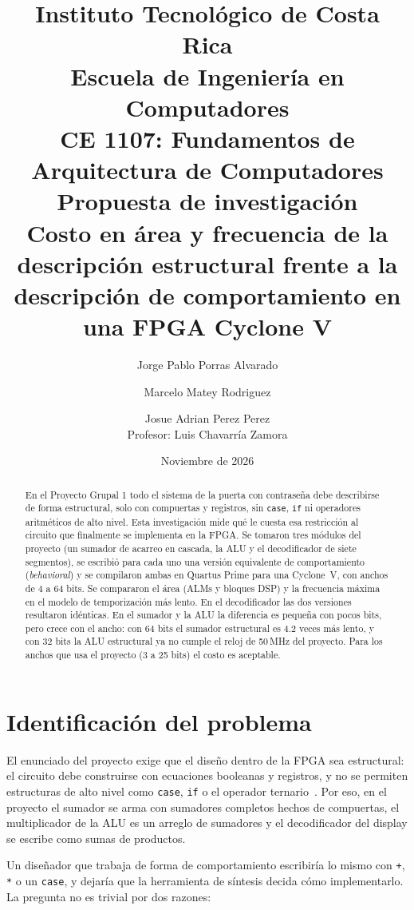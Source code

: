 \documentclass[11pt,letterpaper]{article}
\title{
    \large Instituto Tecnológico de Costa Rica\\
    Escuela de Ingeniería en Computadores\\
    CE 1107: Fundamentos de Arquitectura de Computadores\\[1.2em]
    \Large\textbf{Propuesta de investigación}\\[0.4em]
    \large Costo en área y frecuencia de la descripción estructural frente a la
    descripción de comportamiento en una FPGA Cyclone V
}
\author{
    Jorge Pablo Porras Alvarado \and Marcelo Matey Rodriguez \and Josue Adrian Perez Perez \\[0.8em]
    Profesor: Luis Chavarría Zamora
}
\date{Noviembre de 2026}
\begin{document}
\maketitle

\begin{abstract}
En el Proyecto Grupal 1 todo el sistema de la puerta con contraseña debe describirse de forma
estructural, solo con compuertas y registros, sin \texttt{case}, \texttt{if} ni operadores
aritméticos de alto nivel. Esta investigación mide qué le cuesta esa restricción al circuito que
finalmente se implementa en la FPGA. Se tomaron tres módulos del proyecto (un sumador de
acarreo en cascada, la ALU y el decodificador de siete segmentos), se escribió para cada uno una
versión equivalente de comportamiento (\emph{behavioral}) y se compilaron ambas en Quartus Prime
para una Cyclone~V, con anchos de 4 a 64 bits. Se compararon el área (ALMs y bloques DSP) y la
frecuencia máxima en el modelo de temporización más lento. En el decodificador las dos versiones
resultaron idénticas. En el sumador y la ALU la diferencia es pequeña con pocos bits, pero crece
con el ancho: con 64 bits el sumador estructural es 4.2 veces más lento, y con 32 bits la ALU
estructural ya no cumple el reloj de 50\,MHz del proyecto. Para los anchos que usa el proyecto
(3 a 25 bits) el costo es aceptable.
\end{abstract}

\section{Identificación del problema}

El enunciado del proyecto exige que el diseño dentro de la FPGA sea estructural: el circuito debe
construirse con ecuaciones booleanas y registros, y no se permiten estructuras de alto nivel como
\texttt{case}, \texttt{if} o el operador ternario~\cite{enunciado}. Por eso, en el proyecto el
sumador se arma con sumadores completos hechos de compuertas, el multiplicador de la ALU es un
arreglo de sumadores y el decodificador del display se escribe como sumas de productos.

Un diseñador que trabaja de forma de comportamiento escribiría lo mismo con \texttt{+},
\texttt{*} o un \texttt{case}, y dejaría que la herramienta de síntesis decida cómo implementarlo.
La pregunta no es trivial por dos razones:
\end{document}
